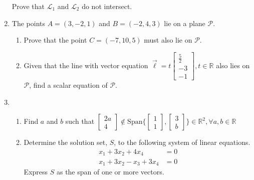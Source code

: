 \documentclass{report}
\newcommand{\R}{{\mathbb{R}}}
\begin{document}
\begin{enumerate}
    Prove that $\mathcal{L}_1$ and $\mathcal{L}_2$ do not intersect.
    \item The points $A = (3, -2, 1)$ and $B = (-2, 4, 3)$ lie on a plane $\mathcal{P}$.
    \begin{enumerate}
        \item Prove that the point $C = (-7, 10, 5)$ must also lie on $\mathcal{P}$.
        \item Given that the line with vector equation $\vec{\ell} = t \begin{bmatrix} \frac{5}{2}\\ -3 \\ -1\end{bmatrix}, t \in \R$ also lies on $\mathcal{P}$, find a scalar equation of $\mathcal{P}$.
    \end{enumerate}
    \item \begin{enumerate}
        \item Find $a$ and $b$ such that $\begin{bmatrix}
        2a \\ 4\end{bmatrix} \notin \text{Span} \bigg\{\begin{bmatrix}
        1 \\ 1\end{bmatrix}, \begin{bmatrix}
        3 \\ b\end{bmatrix} \bigg \} \in \R^2, \forall a, b \in \R$
        \item Determine the solution set, $S$, to the following system of linear equations.
        \begin{align*}
        x_1 + 3x_2 + 4x_4 &= 0\\
        x_1 + 3x_2 - x_3 + 3x_4 &= 0
        \end{align*}
        Express $S$ as the span of one or more vectors.
    \end{enumerate}
\end{enumerate}
\end{document}
